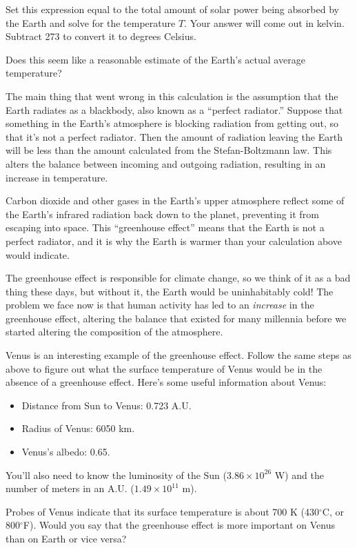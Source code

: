Set this expression equal to the total amount of solar power
being absorbed by the Earth and solve for the temperature $T$.
Your answer will come out in kelvin.  Subtract 273 to convert 
it to degrees Celsius.

\answerspace{1.5in}

Does this seem like a reasonable estimate of the Earth's 
actual average temperature?

\answerspace{1in}

The main thing that went wrong in this calculation is the assumption
that the Earth radiates as a blackbody, also known
as a  ``perfect radiator.''
Suppose that something in the Earth's atmosphere is blocking
radiation from getting out, so that it's not a perfect radiator.
Then the amount of radiation leaving the Earth will be less than 
the amount calculated from the Stefan-Boltzmann law.  This
alters the balance between incoming and outgoing radiation, resulting
in an increase in temperature.

Carbon dioxide and other gases in the Earth's upper atmosphere reflect some of
the Earth's infrared radiation back down to the planet, preventing it from
escaping into space.  This ``greenhouse effect'' means that
the Earth is not a perfect radiator, and it is why
the Earth is warmer than your calculation above would indicate.

The greenhouse effect is responsible for climate change, so
we think of it as a bad thing these days,
but without it, the Earth would be uninhabitably cold!  The
problem we face now is that human activity has led to
an {\it increase} in the
greenhouse effect, altering the balance that existed for 
many millennia before we started altering the composition of the
atmosphere.

Venus is an interesting example of the greenhouse effect.
Follow the same steps as above to figure out what
the surface temperature of Venus would be in the absence of
a greenhouse effect.  Here's some useful information about Venus:

\begin{itemize}
\item Distance from Sun to Venus: 0.723 A.U.
\item Radius of Venus: 6050 km.
\item Venus's albedo: 0.65.
\end{itemize}

You'll also need to know the luminosity of the Sun ($3.86\times 10^{26}$ W)
and the number of meters in an A.U. ($1.49\times 10^{11}$ m).

\vfil

Probes of Venus indicate that its surface temperature is about 700 K
(430$^\circ$C, or 800$^\circ$F).  Would you say that the
greenhouse effect is more important on Venus than on Earth or 
vice versa?

\answerspace{1in}
\eject




